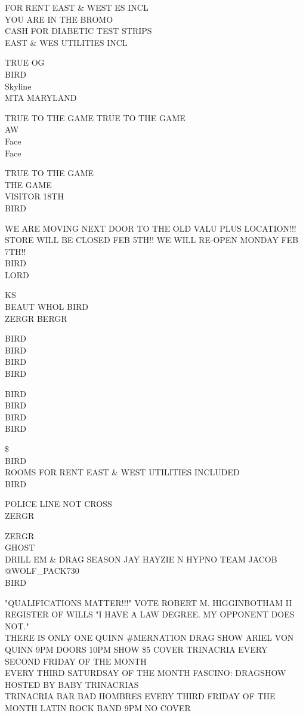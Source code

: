 \documentclass[10pt,letterpaper]{article}
\begin{document}
FOR RENT EAST \& WEST ES INCL\\
YOU ARE IN THE BROMO\\
CASH FOR DIABETIC TEST STRIPS\\
EAST \& WES UTILITIES INCL

TRUE OG\\
BIRD\\
Skyline\\
MTA MARYLAND

TRUE TO THE GAME TRUE TO THE GAME\\
AW\\
Face\\
Face

TRUE TO THE GAME\\
THE GAME\\
VISITOR 18TH\\
BIRD

WE ARE MOVING NEXT DOOR TO THE OLD VALU PLUS LOCATION!!! STORE WILL BE CLOSED FEB 5TH!! WE WILL RE{-}OPEN MONDAY FEB 7TH!!\\
BIRD\\
LORD

KS\\
BEAUT WHOL BIRD\\
ZERGR BERGR

BIRD\\
BIRD\\
BIRD\\
BIRD

BIRD\\
BIRD\\
BIRD\\
BIRD

\$\\
BIRD\\
ROOMS FOR RENT EAST \& WEST UTILITIES INCLUDED\\
BIRD

POLICE LINE NOT CROSS\\
ZERGR

ZERGR\\
GHOST\\
DRILL EM \& DRAG SEASON JAY HAYZIE N HYPNO TEAM JACOB @WOLF\_PACK730\\
BIRD

"QUALIFICATIONS MATTER!!!" VOTE ROBERT M. HIGGINBOTHAM II REGISTER OF WILLS "I HAVE A LAW DEGREE.  MY OPPONENT DOES NOT."\\
THERE IS ONLY ONE QUINN \#MERNATION DRAG SHOW ARIEL VON QUINN 9PM DOORS 10PM SHOW \$5 COVER TRINACRIA EVERY SECOND FRIDAY OF THE MONTH\\
EVERY THIRD SATURDSAY OF THE MONTH FASCINO: DRAGSHOW HOSTED BY BABY TRINACRIAS\\
TRINACRIA BAR BAD HOMBRES EVERY THIRD FRIDAY OF THE MONTH LATIN ROCK BAND 9PM NO COVER
\end{document}
